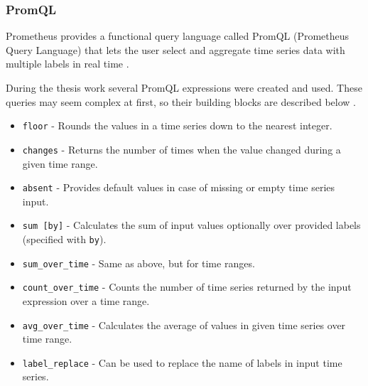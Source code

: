 \subsubsection{PromQL} \label{background-promql}

Prometheus provides a functional query language called PromQL (Prometheus Query Language) that lets the user select and aggregate time series data with multiple labels in real time \cite{PrometheusQueryingBasics}.

During the thesis work several PromQL expressions were created and used. These queries may seem complex at first, so their building blocks are described below \cite{PrometheusQueryingFunctions} \cite{PrometheusQueryingOperators}.

\begin{itemize}
	\item \texttt{floor} - Rounds the values in a time series down to the nearest integer.
	\item \texttt{changes} - Returns the number of times when the value changed during a given time range.
	\item \texttt{absent} - Provides default values in case of missing or empty time series input.
	\item \texttt{sum [by]} - Calculates the sum of input values optionally over provided labels (specified with \texttt{by}).
	\item \texttt{sum\_over\_time} - Same as above, but for time ranges.
	\item \texttt{count\_over\_time} - Counts the number of time series returned by the input expression over a time range.
	\item \texttt{avg\_over\_time} - Calculates the average of values in given time series over time range.
	\item \texttt{label\_replace} - Can be used to replace the name of labels in input time series.
\end{itemize}


